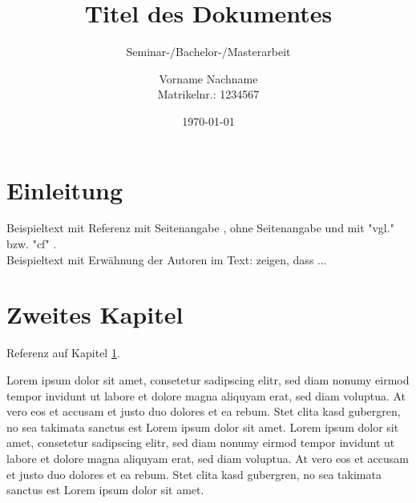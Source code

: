 \documentclass[12pt]{scrartcl}
\title{\vspace{6cm} Titel des Dokumentes}
\subtitle{Seminar-/Bachelor-/Masterarbeit \vspace{2cm}}
\author{Vorname Nachname\\ Matrikelnr.: 1234567 \vspace{0.5cm}}
\date{{\today}\vspace{1cm}}
\begin{document}
\pagestyle{fancy}
\singlespacing


\maketitle
\thispagestyle{empty}
\onehalfspacing









\newpage
\pagestyle{plain}
\tableofcontents








%
%

\newpage
{}
\pagestyle{fancy}







\section{Einleitung} \label{Einleitung}

Beispieltext mit Referenz mit Seitenangabe \parencite[200]{James.2017}, ohne Seitenangabe \parencite{James.2017} und mit "vgl." \parencite[vgl.][]{James.2017} bzw. "cf" \parencite[cf][]{James.2017}. \\
Beispieltext mit Erwähnung der Autoren im Text: \textcite{Russell.2018} zeigen, dass ... 





\newpage




\section{Zweites Kapitel}

Referenz auf Kapitel \ref{Einleitung}. 

Lorem ipsum dolor sit amet, consetetur sadipscing elitr, sed diam nonumy eirmod tempor invidunt ut labore et dolore magna aliquyam erat, sed diam voluptua. At vero eos et accusam et justo duo dolores et ea rebum. Stet clita kasd gubergren, no sea takimata sanctus est Lorem ipsum dolor sit amet. Lorem ipsum dolor sit amet, consetetur sadipscing elitr, sed diam nonumy eirmod tempor invidunt ut labore et dolore magna aliquyam erat, sed diam voluptua. At vero eos et accusam et justo duo dolores et ea rebum. Stet clita kasd gubergren, no sea takimata sanctus est Lorem ipsum dolor sit amet.
\end{document}
